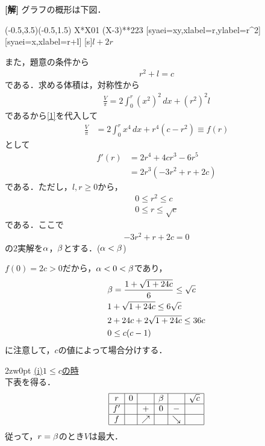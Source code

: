 \documentclass[a4j]{jarticle}
\begin{document}
\setlength{\columnseprule}{0.4pt}
\begin{multicols}{2}
{\bf[解]} グラフの概形は下図．

     \begin{zahyou}[ul=15mm](-0.5,3.5)(-0.5,1.5)
     \def\Fx{X*X}
     \def\Gx{(X-3)**2}
     \YGurafu\Fx{0}{1}
     \YGurafu\Gx{2}{3}
     [syaei=xy,xlabel=r,ylabel=r^2]{}
     [syaei=x,xlabel=r+l]{}
     [s]{$l+2r$}
     \end{zahyou}

また，題意の条件から
     \begin{align}
     r^2+l=c\label{1}
     \end{align}
である．求める体積は，対称性から
     \begin{align*}
     \frac{V}{\pi}=2\int_0^r(x^2)^2\,dx+(r^2)^2l
     \end{align*}
であるから\eqref{1}を代入して
     \begin{align*}
     \frac{V}{\pi}&=2\int_0^rx^4\,dx+r^4(c-r^2)\equiv f(r) 
     \end{align*}
として
     \begin{align*}
     f'(r)&=2r^4+4cr^3-6r^5 \\
     &=2r^3(-3r^2+r+2c)
     \end{align*}
である．ただし，$l,r\ge0$から，
     \begin{align}
     0\le r^2 \le c \nonumber\\
     0\le r\le \sqrt{c} \label{0}
     \end{align}
である．ここで
     \begin{align}
     -3r^2+r+2c=0 \label{2}
     \end{align}
の$2$実解を$\alpha$，$\beta$とする．($\alpha<\beta$)

$f(0)=2c>0$だから，$\alpha<0<\beta$であり，
     \begin{align*}
     &\beta=\frac{1+\sqrt{1+24c}}{6}\le\sqrt{c} \\
     &1+\sqrt{1+24c}\le 6\sqrt{c} \\
     &2+24c+2\sqrt{1+24c}\le 36c \\
     &0\le c(c-1)
     \end{align*}
に注意して，$c$の値によって場合分けする．\\

     \begin{indentation}{2zw}{0pt}
     \noindent\underline{(i)$1\le c$の時} \\
     下表を得る．
          \[
          \begin{array}{|c|c|c|c|c|c|}\hline
          r   &0 &     &\beta  &      &\sqrt{c} \\ \hline
          f'  &   & +   & 0 & -    &            \\ \hline
          f   &  &\nearrow &     &\searrow &            \\ \hline 
          \end{array}
          \]
     従って，$r=\beta$のとき$V$は最大．\\
     

\end{indentation}
\end{multicols}
\end{document}
